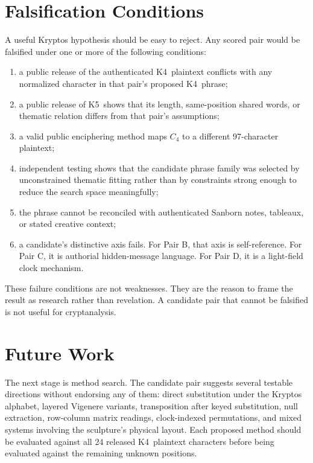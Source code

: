\documentclass[12pt]{paperFormatting}
\newcommand{\Kfour}{K4}
\newcommand{\Kfive}{K5}
\newcommand{\Cipher}{C}
\begin{document}
\begin{thesisbody}
\section{Falsification Conditions}
A useful Kryptos hypothesis should be easy to reject. Any scored pair would be falsified under one or more of the following conditions:
\begin{enumerate}
    \item a public release of the authenticated \Kfour\ plaintext conflicts with any normalized character in that pair's proposed \Kfour\ phrase;
    \item a public release of \Kfive\ shows that its length, same-position shared words, or thematic relation differs from that pair's assumptions;
    \item a valid public enciphering method maps $\Cipher_4$ to a different 97-character plaintext;
    \item independent testing shows that the candidate phrase family was selected by unconstrained thematic fitting rather than by constraints strong enough to reduce the search space meaningfully;
    \item the phrase cannot be reconciled with authenticated Sanborn notes, tableaux, or stated creative context;
    \item a candidate's distinctive axis fails. For Pair B, that axis is self-reference. For Pair C, it is authorial hidden-message language. For Pair D, it is a light-field clock mechanism.
\end{enumerate}

These failure conditions are not weaknesses. They are the reason to frame the result as research rather than revelation. A candidate pair that cannot be falsified is not useful for cryptanalysis.

\section{Future Work}
The next stage is method search. The candidate pair suggests several testable directions without endorsing any of them: direct substitution under the Kryptos alphabet, layered Vigenere variants, transposition after keyed substitution, null extraction, row-column matrix readings, clock-indexed permutations, and mixed systems involving the sculpture's physical layout. Each proposed method should be evaluated against all 24 released \Kfour\ plaintext characters before being evaluated against the remaining unknown positions.


\end{thesisbody}
\end{document}
